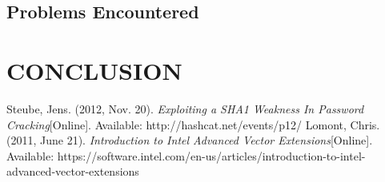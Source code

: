 \documentclass[letterpaper, 10 pt, conference]{ieeeconf}  %
\begin{document}
\subsection{Problems Encountered}

\section{CONCLUSION}


\addtolength{\textheight}{-12cm}   %

















\begin{thebibliography}{99}

 Steube, Jens. (2012, Nov. 20). \emph{Exploiting a SHA1 Weakness In Password Cracking}[Online]. Available: http://hashcat.net/events/p12/
 Lomont, Chris. (2011, June 21). \emph{Introduction to Intel Advanced Vector Extensions}[Online]. Available: https://software.intel.com/en-us/articles/introduction-to-intel-advanced-vector-extensions
 

\end{thebibliography}

\end{document}
